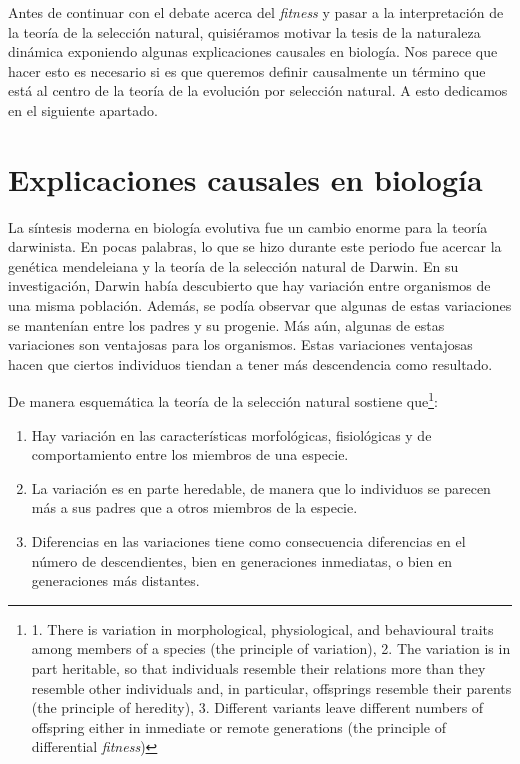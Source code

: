 Antes de continuar con el debate acerca del \emph{fitness} y pasar a la interpretación de la teoría de la selección natural, quisiéramos motivar la tesis de la naturaleza dinámica exponiendo algunas explicaciones causales en biología. Nos parece que hacer esto es necesario si es que queremos definir causalmente un término que está al centro de la teoría de la evolución por selección natural. A esto dedicamos en el siguiente apartado.

\section{Explicaciones causales en biología}

\noindent La síntesis moderna en biología evolutiva fue un cambio enorme para la teoría darwinista. En pocas palabras, lo que se hizo durante este periodo fue acercar la genética mendeleiana y la teoría de la selección natural de Darwin. En su investigación, Darwin había descubierto que hay variación entre organismos de una misma población. Además, se podía observar que algunas de estas variaciones se mantenían entre los padres y su progenie. Más aún, algunas de estas variaciones son ventajosas para los organismos. Estas variaciones ventajosas hacen que ciertos individuos tiendan a tener más descendencia como resultado.

De manera esquemática la teoría de la selección natural sostiene que\footnote{1. There is variation in morphological, physiological, and behavioural traits among members of a species (the principle of variation), 2. The variation is in part heritable, so that individuals resemble their relations more than they resemble other individuals and, in particular, offsprings resemble their parents (the principle of heredity), 3. Different variants leave different numbers of offspring either in inmediate or remote generations (the principle of differential \emph{fitness})}:

\begin{enumerate}
  \item Hay variación en las características morfológicas, fisiológicas y de comportamiento entre los miembros de una especie.
  \item La variación es en parte heredable, de manera que lo individuos se parecen más a sus padres que a otros miembros de la especie.
  \item Diferencias en las variaciones tiene como consecuencia diferencias en el número de descendientes, bien en generaciones inmediatas, o bien en generaciones más distantes\cite{Godfrey-Smith2013}.
\end{enumerate}

